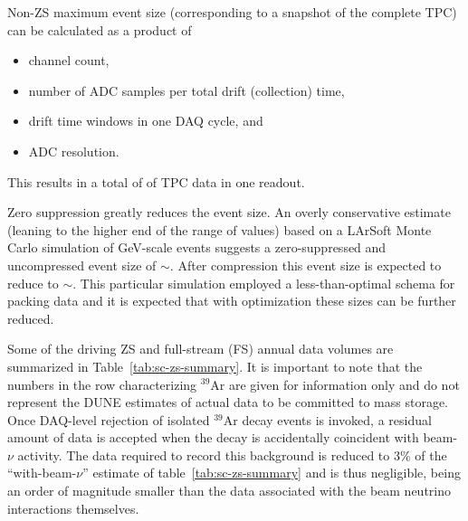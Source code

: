 Non-ZS maximum event size (corresponding to a snapshot of the complete
TPC) can be calculated as a product of %
\begin{itemize}
\item channel count,
\item number of ADC samples per total drift (collection) time,
\item drift time windows in one DAQ cycle, and
\item ADC resolution.
\end{itemize}

This results in a total of \dunefsreadoutsize %
of TPC data in one
readout. 

Zero suppression greatly reduces the event size.  An overly
conservative estimate (leaning to the higher end of the range of
values) based on a LArSoft Monte Carlo simulation of GeV-scale events
suggests a zero-suppressed and uncompressed event size of
$\sim$\beameventsize.  After compression this event size is expected
to reduce to $\sim$\beameventsizecompressed.  This particular simulation
employed a less-than-optimal  schema for packing data and it is
expected that with optimization these sizes can be further reduced.

Some of the driving ZS and full-stream (FS) annual
data volumes are summarized in Table~\ref{tab:sc-zs-summary}. It is
important to note that the numbers in the row characterizing $^{39}$Ar
are given for information only and do not represent the DUNE estimates of
actual data to be committed to mass storage.
Once DAQ-level rejection of isolated $^{39}$Ar decay events is invoked,
a residual amount of data is accepted when the decay is accidentally
coincident with beam-$\nu$ activity.
The data required to record this background is reduced to 3\% of the
``with-beam-$\nu$'' estimate of table~\ref{tab:sc-zs-summary} and is
thus negligible, being an order of magnitude smaller than the data
associated with the beam neutrino interactions themselves.

